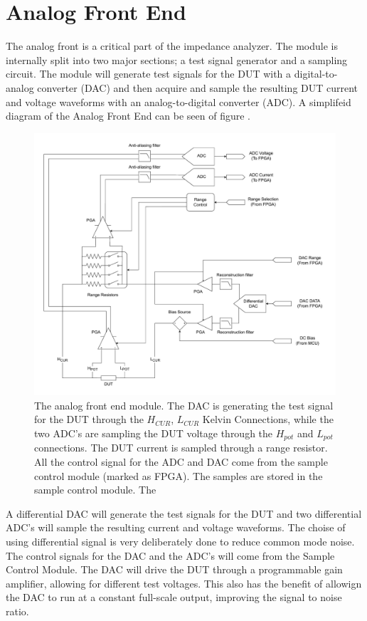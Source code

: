 \section{Analog Front End} \label{sec:AnalogFrontEnd}

The analog front is a critical part of the impedance analyzer. The module is internally split into two major sections; a test signal generator and a sampling circuit. The module will generate test signals for the DUT with a digital-to-analog converter (DAC) and then acquire and sample the resulting DUT current and voltage waveforms with an analog-to-digital converter (ADC). A simplifeid diagram of the Analog Front End can be seen of figure . 
\begin{figure}[H]
    \centering
    \includegraphics[clip, trim=0 0 0 0,width=1\textwidth]{Sections/6_SystemArchitecture/Figures/AnalogFrontEndDetailedBlock.pdf}
    \caption{The analog front end module. The DAC is generating the test signal for the DUT through the $H_{CUR}$, $L_{CUR}$ Kelvin Connections, while the two ADC's are sampling the DUT voltage through the $H_{pot}$ and $L_{pot}$ connections. The DUT current is sampled through a range resistor. All the control signal for the ADC and DAC come from the sample control module (marked as FPGA). The samples are stored in the sample control module. The  }
    \label{fig_6_1_AnalogFrontEnd}
\end{figure}

A differential DAC will generate the test signals for the DUT and two differential ADC's will sample the resulting current and voltage waveforms. The choise of using differential signal is very deliberately done to reduce common mode noise. The control signals for the DAC and the ADC's will come from the Sample Control Module. The DAC will drive the DUT through a programmable gain amplifier, allowing for different test voltages. This also has the benefit of allowign the DAC to run at a constant full-scale output, improving the signal to noise ratio. 

